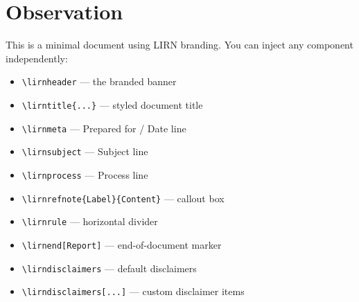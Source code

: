 \documentclass[report]{lirn}
\begin{document}
\lirnheader


\lirnmeta

\section{Observation}

This is a minimal document using LIRN branding. You can inject any component
independently:

\begin{itemize}
  \item \texttt{\textbackslash lirnheader} --- the branded banner
  \item \texttt{\textbackslash lirntitle\{...\}} --- styled document title
  \item \texttt{\textbackslash lirnmeta} --- Prepared for / Date line
  \item \texttt{\textbackslash lirnsubject} --- Subject line
  \item \texttt{\textbackslash lirnprocess} --- Process line
  \item \texttt{\textbackslash lirnrefnote\{Label\}\{Content\}} --- callout box
  \item \texttt{\textbackslash lirnrule} --- horizontal divider
  \item \texttt{\textbackslash lirnend[Report]} --- end-of-document marker
  \item \texttt{\textbackslash lirndisclaimers} --- default disclaimers
  \item \texttt{\textbackslash lirndisclaimers[...]} --- custom disclaimer items
\end{itemize}


\lirnend[Note]
\lirndisclaimers
\end{document}
